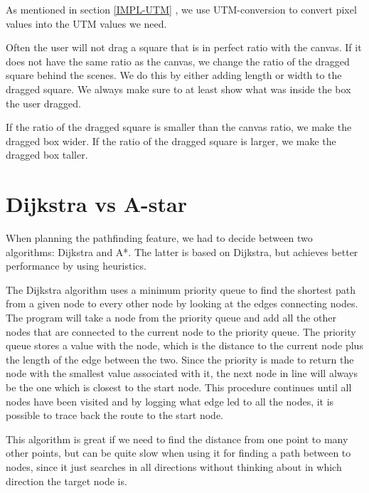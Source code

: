 As mentioned in section \ref{IMPL-UTM} , we use
UTM-conversion to convert pixel values into the UTM values we need.

Often the user will not drag a square that is in perfect ratio with the
canvas. If it does not have the same ratio as the canvas, we change the ratio
of the dragged square behind the scenes. We do this by either adding length or
width to the dragged square. We always make sure to at least show what was
inside the box the user dragged.

If the ratio of the dragged square is smaller than the canvas ratio, we make the
dragged box wider. If the ratio of the dragged square is larger, we make the
dragged box taller.

\section{Dijkstra vs A-star}
\label{IMPL-DVA}
When planning the pathfinding feature, we had to decide between two algorithms: 
Dijkstra and A*. The latter is based on Dijkstra, but achieves better performance by 
using heuristics.

The Dijkstra algorithm uses a minimum priority queue to find the shortest path 
from a given node to every other node by looking at the edges connecting nodes. 
The program will take a node from the priority queue and add all the other nodes 
that are connected to the current node to the priority queue. The priority queue 
stores a value with the node, which is the distance to the current node 
plus the length of the edge between the two. Since the priority is made to return 
the node with the smallest value associated with it, the next node in line will 
always be the one which is closest to the start node. This procedure continues 
until all nodes have been visited and by logging what edge led to all the nodes, 
it is possible to trace back the route to the start node.

This algorithm is great if we need to find the distance from one point to many other 
points, but can be quite slow when using it for finding a path between to nodes, 
since it just searches in all directions without thinking about in which direction the 
target node is.


